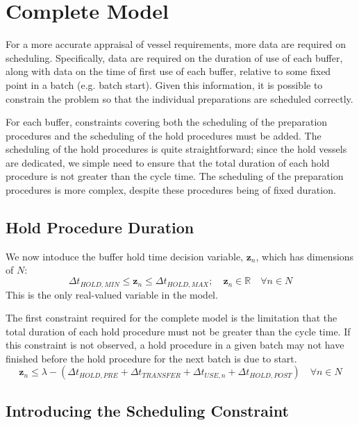 \section{Complete Model}\label{S.prepsched}

For a more accurate appraisal of vessel requirements, more data are required
on scheduling.
Specifically, data are required on the duration of use of each buffer, along
with data on the time of first use of each buffer, relative to some fixed point
in a batch (e.g. batch start).
Given this information, it is possible to constrain the problem so that the
individual preparations are scheduled correctly.

For each buffer, constraints covering both the scheduling of the preparation
procedures and the scheduling of the hold procedures must be added.
The scheduling of the hold procedures is quite straightforward; since the hold
vessels are dedicated, we simple need to ensure that the total duration of each
hold procedure is not greater than the cycle time.
The scheduling of the preparation procedures is more complex, despite these
procedures being of fixed duration.

\subsection{Hold Procedure Duration}\label{SS.constr5}

We now intoduce the buffer hold time decision variable, $\boldsymbol{z}_{n}$,
which has dimensions of $N$:
\begin{equation}
    \Delta t_{HOLD,MIN} \le \boldsymbol{z}_{n} \le \Delta t_{HOLD,MAX}; \quad
    \boldsymbol{z}_{n} \in \mathbb{R} \quad \forall n \in N
    \label{eq.z}
\end{equation}
This is the only real-valued variable in the model.

The first constraint required for the complete model is the limitation that the
total duration of each hold procedure must not be greater than the cycle time.
If this constraint is not observed, a hold procedure in a given batch may not
have finished before the hold procedure for the next batch is due to start.
\begin{equation}
    \boldsymbol{z}_{n} \le \lambda - \left( \Delta t_{HOLD,PRE} +
    \Delta t_{TRANSFER} + \Delta t_{USE,n} + \Delta t_{HOLD,POST} \right)
    \quad \forall n \in N
    \label{eq.constr5}
\end{equation}

\subsection{Introducing the Scheduling Constraint}\label{SS.schedintro}

